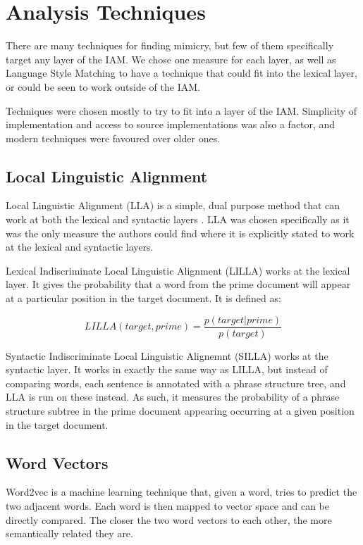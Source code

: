 \documentclass[conference]{IEEEtran}
\begin{document}
\section{Analysis Techniques}

There are many techniques for finding mimicry, but few of them specifically target any layer of the IAM. We chose one measure for each layer, as well as Language Style Matching to have a technique that could fit into the lexical layer, or could be seen to work outside of the IAM.

Techniques were chosen mostly to try to fit into a layer of the IAM. Simplicity of implementation and access to source implementations was also a factor, and modern techniques were favoured over older ones.


\subsection{Local Linguistic Alignment}
Local Linguistic Alignment (LLA) is a simple, dual purpose method that can work at both the lexical and syntactic layers \cite{wang2014linguistic, xu2015evaluation}. LLA was chosen specifically as it was the only measure the authors could find where it is explicitly stated to work at the lexical and syntactic layers.

Lexical Indiscriminate Local Linguistic Alignment (LILLA) works at the lexical layer. It gives the probability that a word from the prime document will appear at a particular position in the target  document. It is defined as:

\[LILLA(target, prime) = \frac{p(target|prime)}{p(target)}\]

Syntactic Indiscriminate Local Linguistic Alignemnt (SILLA) works at the syntactic layer. It works in exactly the same way as LILLA, but instead of comparing words, each sentence is annotated with a phrase structure tree, and LLA is run on these instead. As such, it measures the probability of a phrase structure subtree in the prime document appearing occurring at a given position in the target document.


\subsection{Word Vectors}
Word2vec \cite{mikolov2013efficient} is a machine learning technique that, given a word, tries to predict the two adjacent words. Each word is then mapped to vector space and can be directly compared. The closer the two word vectors to each other, the more semantically related they are.
\end{document}
